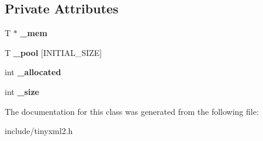 \subsection*{Private Attributes}
\begin{DoxyCompactItemize}
\item 
\hypertarget{classtinyxml2_1_1_dyn_array_ac8511e876d55f3ec64277516273434fd}{}T $\ast$ {\bfseries \+\_\+mem}\label{classtinyxml2_1_1_dyn_array_ac8511e876d55f3ec64277516273434fd}

\item 
\hypertarget{classtinyxml2_1_1_dyn_array_a26ed1f7dab98229d2ed867a07ee427df}{}T {\bfseries \+\_\+pool} \mbox{[}I\+N\+I\+T\+I\+A\+L\+\_\+\+S\+I\+Z\+E\mbox{]}\label{classtinyxml2_1_1_dyn_array_a26ed1f7dab98229d2ed867a07ee427df}

\item 
\hypertarget{classtinyxml2_1_1_dyn_array_aee2522b771ca30bc09bff4d5b3176bfc}{}int {\bfseries \+\_\+allocated}\label{classtinyxml2_1_1_dyn_array_aee2522b771ca30bc09bff4d5b3176bfc}

\item 
\hypertarget{classtinyxml2_1_1_dyn_array_a40f0578cc1912eed17fb29f64daf6ae9}{}int {\bfseries \+\_\+size}\label{classtinyxml2_1_1_dyn_array_a40f0578cc1912eed17fb29f64daf6ae9}

\end{DoxyCompactItemize}


The documentation for this class was generated from the following file\+:\begin{DoxyCompactItemize}
\item 
include/tinyxml2.\+h\end{DoxyCompactItemize}
